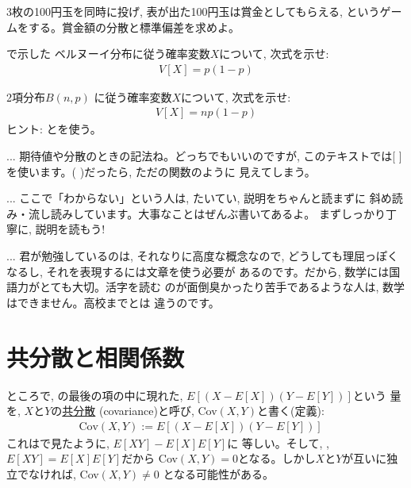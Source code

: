 \begin{q}\label{q:stat_3coins_var} 3枚の100円玉を同時に投げ, 表が出た100円玉は賞金としてもらえる, 
というゲームをする。賞金額の分散と標準偏差を求めよ。
\end{q}
\mv

\begin{q}\label{q:stat_Bernoulli_V} で示した
ベルヌーイ分布に従う確率変数$X$について, 次式を示せ:
\begin{eqnarray}
V[X]=p(1-p)\label{eq:stat_Bernoulli_V}
\end{eqnarray}
\end{q}\mv

\begin{q}\label{q:stat_binomial_V} 2項分布$B(n, p)$
に従う確率変数$X$について, 次式を示せ:
\begin{eqnarray}
V[X]=np(1-p)
\end{eqnarray}
ヒント: とを使う。
\end{q}

\begin{faq}{\small{}
 ... 期待値や分散のときの記法ね。どっちでもいいのですが, 
このテキストでは[ ]を使います。( )だったら, ただの関数のように
見えてしまう。}\end{faq}
\mv

\begin{faq}{\small{}
 ... ここで「わからない」という人は, たいてい, 説明をちゃんと読まずに
斜め読み・流し読みしています。大事なことはぜんぶ書いてあるよ。
まずしっかり丁寧に, 説明を読もう!}\end{faq}
\mv

\begin{faq}{\small{}
 ... 君が勉強しているのは, それなりに高度な概念なので, 
どうしても理屈っぽくなるし, それを表現するには文章を使う必要が
あるのです。だから, 数学には国語力がとても大切。活字を読む
のが面倒臭かったり苦手であるような人は, 数学はできません。高校までとは
違うのです。}\end{faq}
\vv

\section{共分散と相関係数}
ところで, の最後の項の中に現れた, $E[(X-E[X])(Y-E[Y])]$という
量を, $X$と$Y$の\underline{共分散} (covariance)と呼び, Cov$(X, Y)$と書く(定義):
\begin{eqnarray}
\text{Cov}(X, Y):=E[(X-E[X])(Y-E[Y])]\,\,\,\,\,\,\label{eq:def_covar}
\end{eqnarray}
これはで見たように, $E[XY]-E[X]E[Y]$に
等しい。そして, , $E[XY]=E[X]E[Y]$だから
Cov$(X, Y)=0$となる。しかし$X$と$Y$が互いに独立でなければ, Cov$(X, Y)\ne0$
となる可能性がある。

